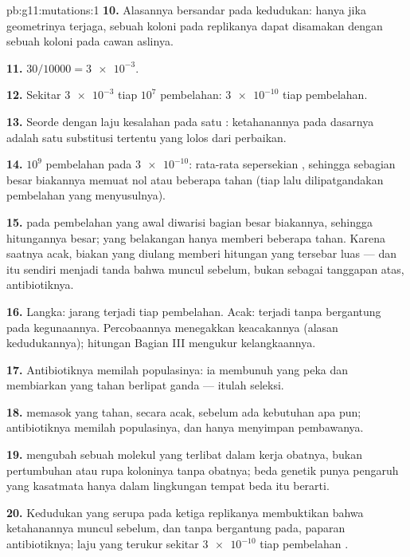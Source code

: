 \begin{solution}{pb:g11:mutations:1}
\textbf{10.} Alasannya bersandar pada kedudukan: hanya jika
geometrinya terjaga, sebuah koloni pada replikanya dapat disamakan
dengan sebuah koloni pada cawan aslinya.

\textbf{11.} $30/\num{10000} = \num{3e-3}$.

\textbf{12.} Sekitar $\num{3e-3}$  tiap $10^7$ pembelahan:
$\num{3e-10}$ tiap pembelahan.

\textbf{13.} Seorde dengan laju kesalahan pada satu : 
ketahanannya pada dasarnya adalah satu substitusi tertentu yang lolos
dari perbaikan.

\textbf{14.} $10^9$ pembelahan pada $\num{3e-10}$: rata-rata sepersekian
, sehingga sebagian besar biakannya memuat nol atau beberapa 
tahan (tiap  lalu dilipatgandakan pembelahan yang menyusulnya).

\textbf{15.}  pada pembelahan yang awal diwarisi bagian besar
biakannya, sehingga hitungannya besar;  yang belakangan hanya
memberi beberapa  tahan. Karena saatnya acak, biakan yang diulang
memberi hitungan yang tersebar luas --- dan itu sendiri menjadi tanda
bahwa  muncul sebelum, bukan sebagai tanggapan atas, antibiotiknya.

\textbf{16.} Langka:  jarang terjadi tiap pembelahan. Acak:
 terjadi tanpa bergantung pada kegunaannya. Percobaannya
menegakkan keacakannya (alasan kedudukannya); hitungan Bagian III
mengukur kelangkaannya.

\textbf{17.} Antibiotiknya memilah populasinya: ia membunuh  yang
peka dan membiarkan  yang tahan berlipat ganda --- itulah seleksi.

\textbf{18.}  memasok  yang tahan, secara acak, sebelum ada
kebutuhan apa pun; antibiotiknya memilah populasinya, dan hanya
menyimpan pembawanya.

\textbf{19.}  mengubah sebuah molekul yang terlibat dalam
kerja obatnya, bukan pertumbuhan atau rupa koloninya tanpa obatnya;
beda genetik punya pengaruh yang kasatmata hanya dalam lingkungan
tempat beda itu berarti.

\textbf{20.} Kedudukan yang serupa pada ketiga replikanya membuktikan
bahwa  ketahanannya muncul sebelum, dan tanpa bergantung pada,
paparan antibiotiknya; laju yang terukur sekitar $\num{3e-10}$ tiap
pembelahan .
\end{solution}
